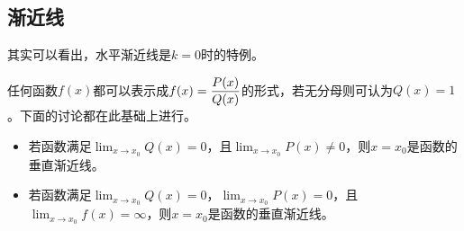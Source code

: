 \subsection{渐近线}
其实可以看出，水平渐近线是$k=0$时的特例。

任何函数$f(x)$都可以表示成$\displaystyle f(x)={P(x)\over Q(x)}$的形式，若无分母则可认为$Q(x)=1$。下面的讨论都在此基础上进行。
\begin{itemize}
\item 若函数满足$\displaystyle\lim_{x\to x_0}Q(x)=0$，且$\displaystyle\lim_{x\to x_0}P(x)\neq0$，则$x=x_0$是函数的垂直渐近线。
\item 若函数满足$\displaystyle\lim_{x\to x_0}Q(x)=0$，$\displaystyle\lim_{x\to x_0}P(x)=0$，且$\displaystyle \lim_{x\to x_0}f(x)=\infty$，则$x=x_0$是函数的垂直渐近线。
\end{itemize}